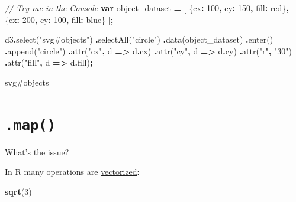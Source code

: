 \documentclass[
  openany]{book}
\newenvironment{Shaded}{\begin{snugshade}}{\end{snugshade}}
\newcommand{\AttributeTok}[1]{\textcolor[rgb]{0.77,0.63,0.00}{#1}}
\newcommand{\CommentTok}[1]{\textcolor[rgb]{0.56,0.35,0.01}{\textit{#1}}}
\newcommand{\DataTypeTok}[1]{\textcolor[rgb]{0.13,0.29,0.53}{#1}}
\newcommand{\DecValTok}[1]{\textcolor[rgb]{0.00,0.00,0.81}{#1}}
\newcommand{\FunctionTok}[1]{\textcolor[rgb]{0.00,0.00,0.00}{#1}}
\newcommand{\KeywordTok}[1]{\textcolor[rgb]{0.13,0.29,0.53}{\textbf{#1}}}
\newcommand{\NormalTok}[1]{#1}
\newcommand{\OperatorTok}[1]{\textcolor[rgb]{0.81,0.36,0.00}{\textbf{#1}}}
\newcommand{\StringTok}[1]{\textcolor[rgb]{0.31,0.60,0.02}{#1}}
\newcommand{\VerbatimStringTok}[1]{\textcolor[rgb]{0.31,0.60,0.02}{#1}}
\begin{document}
\begin{Shaded}
\begin{Highlighting}[]
\CommentTok{// Try me in the Console}
\KeywordTok{var}\NormalTok{ object\_dataset }\OperatorTok{=}\NormalTok{ [}
\NormalTok{  \{}\DataTypeTok{cx}\OperatorTok{:} \DecValTok{100}\OperatorTok{,} \DataTypeTok{cy}\OperatorTok{:} \DecValTok{150}\OperatorTok{,} \DataTypeTok{fill}\OperatorTok{:} \VerbatimStringTok{\textasciigrave{}red\textasciigrave{}}\NormalTok{\}}\OperatorTok{,}
\NormalTok{  \{}\DataTypeTok{cx}\OperatorTok{:} \DecValTok{200}\OperatorTok{,} \DataTypeTok{cy}\OperatorTok{:} \DecValTok{100}\OperatorTok{,} \DataTypeTok{fill}\OperatorTok{:} \VerbatimStringTok{\textasciigrave{}blue\textasciigrave{}}\NormalTok{\}}
\NormalTok{  ]}\OperatorTok{;}

\NormalTok{d3}\OperatorTok{.}\FunctionTok{select}\NormalTok{(}\StringTok{"svg\#objects"}\NormalTok{)}
  \OperatorTok{.}\FunctionTok{selectAll}\NormalTok{(}\StringTok{"circle"}\NormalTok{)}
  \OperatorTok{.}\FunctionTok{data}\NormalTok{(object\_dataset)}
  \OperatorTok{.}\FunctionTok{enter}\NormalTok{()}
  \OperatorTok{.}\FunctionTok{append}\NormalTok{(}\StringTok{"circle"}\NormalTok{)}
    \OperatorTok{.}\FunctionTok{attr}\NormalTok{(}\StringTok{"cx"}\OperatorTok{,}\NormalTok{ d }\KeywordTok{=\textgreater{}}\NormalTok{ d}\OperatorTok{.}\AttributeTok{cx}\NormalTok{)}
    \OperatorTok{.}\FunctionTok{attr}\NormalTok{(}\StringTok{"cy"}\OperatorTok{,}\NormalTok{ d }\KeywordTok{=\textgreater{}}\NormalTok{ d}\OperatorTok{.}\AttributeTok{cy}\NormalTok{)}
    \OperatorTok{.}\FunctionTok{attr}\NormalTok{(}\StringTok{"r"}\OperatorTok{,} \StringTok{"30"}\NormalTok{)}
    \OperatorTok{.}\FunctionTok{attr}\NormalTok{(}\StringTok{"fill"}\OperatorTok{,}\NormalTok{ d }\KeywordTok{=\textgreater{}}\NormalTok{ d}\OperatorTok{.}\AttributeTok{fill}\NormalTok{)}\OperatorTok{;}
\end{Highlighting}
\end{Shaded}

svg\#objects

\hypertarget{map}{%
\section{\texorpdfstring{\texttt{.map()}}{.map()}}\label{map}}

What's the issue?

In R many operations are \href{https://bookdown.org/rdpeng/rprogdatascience/vectorized-operations.html}{vectorized}:

\begin{Shaded}
\begin{Highlighting}[]
\KeywordTok{sqrt}\NormalTok{(}\DecValTok{3}\NormalTok{)}
\end{Highlighting}
\end{Shaded}
\end{document}
